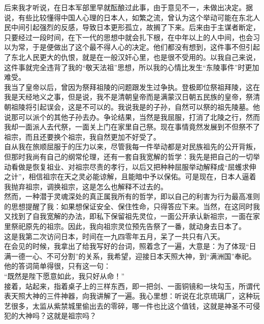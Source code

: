 后来我才听说，在日本军部里早就酝酿过此事，由于意见不一，未做出决定。据说，有些比较懂得中国人心理的日本人，如繁之流，曾认为这个举动可能在东北人民中间引起强烈的反感，导致日本更形孤立，故搁了下来。后来由于主谋者断定，只要经过一段时间，在下一代的思想中就会扎下根，在中年以上的人中间，也会习以为常，于是便做出了这个最不得人心的决定。他们都没有想到，这件事不但引起了东北人民更大的仇恨，就是在一般汉奸心里，也是很不受用的。以我自己来说，这件事就完全违背了我的“敬天法祖”思想，所以我的心情比发生“东陵事件”时更加难受。\\

我当了皇帝以后，曾因为祭拜祖陵的问题跟发生过争执。登极即位祭祖拜陵，这在我是天经地义之事，但是说，我不是清朝皇帝而是满蒙汉日朝五民族的皇帝，祭清朝祖陵将引起误会，这是不可以的。我说我是的子孙，自然可以祭的祖先陵墓。他说那可以派个的其他子孙去办。争论结果，当然是我屈服，打消了北陵之行，然而我却一面派人去代祭，一面关上门在家里自己祭。现在事情竟然发展到不但祭不了祖宗，而且还要换个祖宗，我自然更加不好受了。\\

自从我在旅顺屈服于的压力以来，尽管我每一件举动都是对民族祖先的公开背叛，但那时我尚有自己的纲常伦理，还有一套自我宽解的哲学：我先是把自己的一切举动看做是恢复祖业、对祖宗尽责的孝行，以后又把种种屈服举动解释成“屈蠖求伸之计”，相信祖宗在天之灵必能谅解，且能暗中予以保佑。可是现在，日本人逼着我抛弃祖宗，调换祖宗，这是怎么也解释不过去的。\\

然而，一种潜于灵魂深处的真正属我所有的哲学，即以自己的利害为行为最高准则的思想提醒了我：如果想保证安全、保住性命，只得答应下来。当然，在这同时我又找到了自我宽解的办法，即私下保留祖先灵位，一面公开承认新祖宗，一面在家里祭祀原先的祖宗。因此，我向祖宗灵位预先告祭了一番，就动身去日本了。\\

这是我第二次访问日本，时间在一九四零年五月，呆了一共只有八天。\\

在会见的时候，我拿出了给我写好的台词，照着念了一遍，大意是：为了体现“日满一德一心、不可分割”的关系，我希望，迎接日本天照大神，到“满洲国”奉祀。他的答词简单得很，只有这一句：\\

“既然是陛下愿意如此，我只好从命！”\\

接着，站起来，指着桌子上的三样东西，即一把剑、一面铜镜和一块勾玉，所谓代表天照大神的三件神器，向我讲解了一遍。我心里想：听说在北京琉璃厂，这种玩艺很多，太监从紫禁城里偷出去的零碎，哪一件也比这个值钱，这就是神圣不可侵犯的大神吗？这就是祖宗吗？\\


